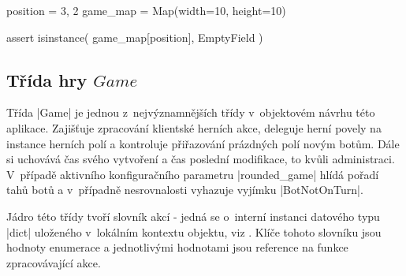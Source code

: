 \begin{code}[caption={Přetížené indexování třídy $Map$},label=lst:map-indexing]
position = 3, 2
game_map = Map(width=10, height=10)

assert isinstance(
	game_map[position],
	EmptyField
)
\end{code}

\subsection{Třída hry $Game$}

Třída \ic|Game| je jednou z~nejvýznamnějších třídy v~objektovém návrhu této aplikace. Zajišťuje zpracování klientské herních akce, deleguje herní povely na instance herních polí a kontroluje přiřazování prázdných polí novým botům. Dále si uchovává čas svého vytvoření a čas poslední modifikace, to kvůli administraci. V~případě aktivního konfiguračního parametru \ic|rounded_game| hlídá pořadí tahů botů a v~případně nesrovnalosti vyhazuje vyjímku \ic|BotNotOnTurn|.

Jádro této třídy tvoří slovník akcí - jedná se o~interní instanci datového typu \ic|dict| uloženého v~lokálním kontextu objektu, viz . Klíče tohoto slovníku jsou hodnoty enumerace  a jednotlivými hodnotami jsou reference na funkce zpracovávající akce.
\\


